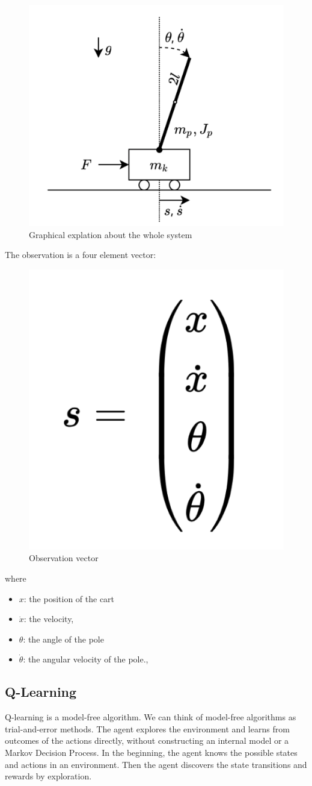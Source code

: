 \documentclass{article}
\begin{document}
\begin{figure}[h]
	\centering
	\includegraphics[width=0.5\linewidth]{../data/images/cart.png}
	\caption{Graphical explation about the whole system}
	\label{fig:plot1}
\end{figure}
The observation is a four element vector: 
\begin{figure}[h]
	\centering
	\includegraphics[width=0.2\linewidth]{../data/images/vector.png}
	\caption{Observation vector}
	\label{fig:plot1}
\end{figure}

where 
\begin{itemize}
	\item $x$: the position of the cart
	\item $\dot{x}$: the velocity, 
	\item $\theta$:  the angle of the pole
	\item $\dot{\theta}$: the angular velocity of the pole., 	
\end{itemize}

\subsection{Q-Learning}
Q-learning is a model-free algorithm. We can think of model-free algorithms as trial-and-error methods. The agent explores the environment and learns from outcomes of the actions directly, without constructing an internal model or a Markov Decision Process.
In the beginning, the agent knows the possible states and actions in an environment. Then the agent discovers the state transitions and rewards by exploration.
\end{document}
